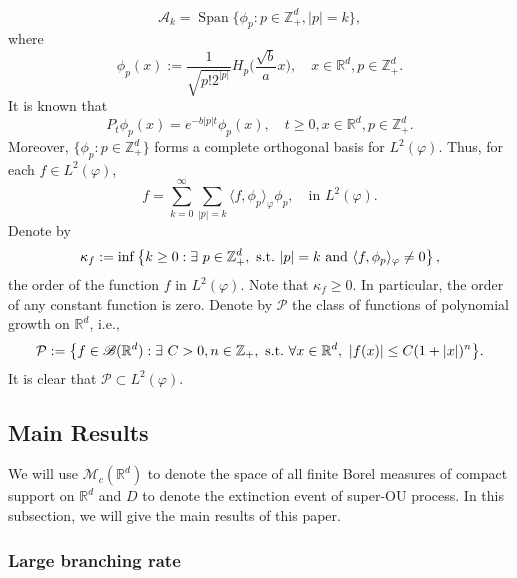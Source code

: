 \documentclass[12pt,a4paper]{amsart}
\theoremstyle{plain}
\theoremstyle{definition}
\numberwithin{equation}{section}
\begin{document}
\begin{equation}
    \mathcal{A}_k
    = \operatorname{Span} \{\phi_p : p\in \mathbb Z_+^d, |p|=k\},
\end{equation}
where
\begin{equation}\label{eigenfunction}
    \phi_p(x)
    := \frac{1}{\sqrt{ p! 2^{|p|} }} H_p \Big(\frac{ \sqrt{b} }{a}x \Big),
    \quad x\in \mathbb R^d, p\in \mathbb Z_+^d.
\end{equation}
    It is known that
\begin{equation}\label{semigroupformula}
    P_t\phi_p(x)
    =e^{-b|p|t}\phi_p(x),
    \quad t\geq 0, x\in \mathbb R^d, p\in \mathbb Z_+^d.
\end{equation}
    Moreover, $\{\phi_p: p \in \mathbb Z_+^d\}$ forms a complete orthogonal basis for $L^2(\varphi)$.
    Thus, for each $f\in L^2(\varphi)$,
\begin{equation}\label{semicomp1}
    f
    =\sum_{k=0}^{\infty}\sum_{|p|=k}\langle f, \phi_p \rangle_{\varphi} \phi_p,
    \quad \text{in~} L^2(\varphi).
\end{equation}
    Denote by
\begin{equation}\label{order}
    \kappa_f
    :=\inf \left \{k\geq 0: \exists ~ p\in \mathbb Z_+^d ,{\rm ~s.t.~}|p|=k {\rm ~and~}  \langle f, \phi_p \rangle_{\varphi}\neq 0\right \},
\end{equation}
    the order of the function $f$ in $L^2(\varphi)$.
    Note that $ \kappa_f\geq 0$.
    In particular, the order of any constant function is zero.
    Denote by $\mathcal P$ the class of functions of polynomial growth on $\mathbb R^d$, i.e.,
\begin{equation}
    \mathcal{P}
    :=\big \{f\in \mathscr B(\mathbb R^d):\exists~ C>0, n \in \mathbb Z_+, {\rm ~s.t.~} \forall x\in \mathbb R^d,~ |f(x)|\leq C(1+|x|)^n\big\}.
\end{equation}
    It is clear that $\mathcal{P} \subset L^2(\varphi)$.
\subsection{Main Results}
We will use $\mathcal M_c(\mathbb R^d)$ to denote the space of all
finite Borel measures of compact support on $\mathbb R^d$ and $D$ to denote the extinction event of super-OU process.
In this subsection, we will give the main results of this paper.
\subsubsection{Large branching rate}
\end{document}
